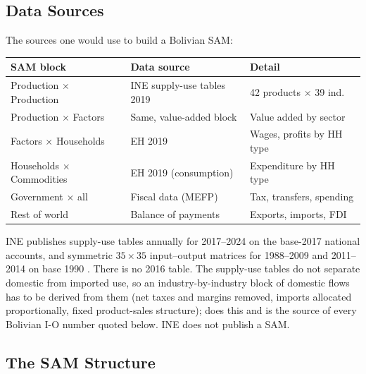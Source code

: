 \documentclass[../structural_economics_book.tex]{subfiles}
\begin{document}
\subsection{Data Sources}

\begin{example}\label{ch20:ex:data}
The sources one would use to build a Bolivian SAM:
\begin{center}
\begin{tabular}{lll}
\toprule
\textbf{SAM block} & \textbf{Data source} & \textbf{Detail} \\
\midrule
Production $\times$ Production & INE supply-use tables 2019 & 42 products $\times$ 39 ind. \\
Production $\times$ Factors & Same, value-added block & Value added by sector \\
Factors $\times$ Households & EH 2019 & Wages, profits by HH type \\
Households $\times$ Commodities & EH 2019 (consumption) & Expenditure by HH type \\
Government $\times$ all & Fiscal data (MEFP) & Tax, transfers, spending \\
Rest of world & Balance of payments & Exports, imports, FDI \\
\bottomrule
\end{tabular}
\end{center}
INE publishes supply-use tables annually for 2017--2024 on the base-2017 national accounts, and symmetric $35 \times 35$ input--output matrices for 1988--2009 and 2011--2014 on base 1990 \citep{ine2026sut}. There is no 2016 table. The supply-use tables do not separate domestic from imported use, so an industry-by-industry block of domestic flows has to be derived from them (net taxes and margins removed, imports allocated proportionally, fixed product-sales structure);  does this and is the source of every Bolivian I-O number quoted below. INE does not publish a SAM.
\end{example}

\subsection{The SAM Structure}
\end{document}

